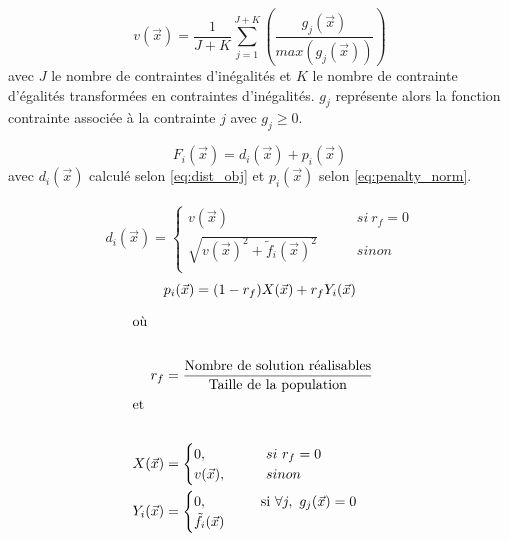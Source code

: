 \begin{equation}\label{eq:norm_contrainte}
  v(\vec{x}) = \frac{1}{J+K} \sum_{j=1}^{J+K} \left(\frac{g_{j}(\vec{x})}{max(g_{j}(\vec{x}))}\right)
\end{equation}
avec $J$ le nombre de contraintes d’inégalités et $K$ le nombre de contrainte d’égalités
transformées en contraintes d’inégalités. $g_{j}$ représente alors la fonction contrainte
associée à la contrainte $j$ avec $g_{j} \geq 0$.

\begin{equation}\label{eq:calc_modif_obj}
  F_{i}(\vec{x}) = d_{i}(\vec{x}) + p_{i}(\vec{x})
\end{equation}
avec $d_{i}(\vec{x})$ calculé selon \eqref{eq:dist_obj} et $ p_{i}(\vec{x})$ selon \eqref{eq:penalty_norm}.


\begin{align}\label{eq:dist_obj}
  d_{i}(\vec{x}) = \begin{cases}
                          v(\vec{x})                                     & \qquad si\  r_{f} = 0 \\
                          \sqrt{v(\vec{x})^2 + \tilde{f}_{i}(\vec{x})^2} & \qquad sinon          \\
                    \end{cases}
\end{align}
\begin{equation}\label{eq:penalty_norm}
  p_{i}(\vec{x}) = (1 - r_{f})  X(\vec{x}) + r_{f} Y_{i}(\vec{x}) \\
\end{equation}

\begin{align*}
  \shortintertext{où} \\
    r_{f} &= \frac{\text{Nombre de solution réalisables}}{\text{Taille de la population}} \\
  \shortintertext{et} \\
  X(\vec{x})     &= \begin{cases}
                0,          \qquad     & si\  r_{f} = 0\\
                v(\vec{x}), \qquad     & sinon\\
                \end{cases} \\
  Y_{i}(\vec{x}) &= \begin{cases}
                    0,          \quad \qquad & \text{si} \ \forall j, \ g_{j}(\vec{x}) = 0\\
                      \tilde{f}_{i}(\vec{x})  \\
            \end{cases}\\
\end{align*}

